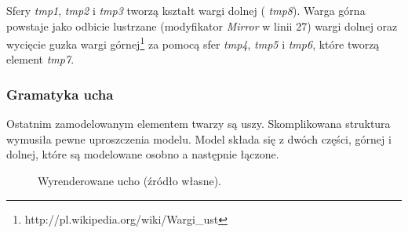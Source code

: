 Sfery {\em tmp1}, {\em tmp2} i {\em tmp3} tworzą kształt wargi dolnej ({\em
tmp8}). Warga górna powstaje jako odbicie lustrzane (modyfikator {\em Mirror} w
linii 27) wargi dolnej oraz wycięcie guzka wargi
górnej\footnote{http://pl.wikipedia.org/wiki/Wargi\_ust} za pomocą sfer {\em
tmp4}, {\em tmp5} i {\em tmp6}, które tworzą element {\em tmp7}.

\subsubsection{Gramatyka ucha}
Ostatnim zamodelowanym elementem twarzy są uszy. Skomplikowana struktura
wymusiła pewne uproszczenia modelu. Model składa się z dwóch części, górnej i
dolnej, które są modelowane osobno a następnie łączone.

\begin{figure}[h!]
  \centering
  \qquad
  \caption{Wyrenderowane ucho (źródło własne).}
\end{figure}


